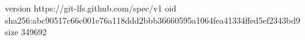 version https://git-lfs.github.com/spec/v1
oid sha256:abc90517c66c001e76a118ddd2bbb36660595a1064fea41334ffed5ef2343bd9
size 349692
